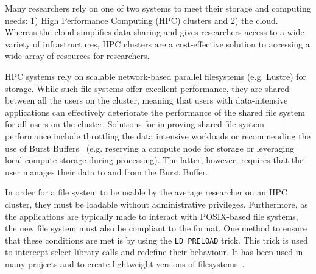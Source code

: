     
    
    
    Many researchers rely on one of two systems to meet their storage and
    computing needs: 1) High Performance Computing (HPC) clusters and 2) the
    cloud. Whereas the cloud simplifies data sharing and gives researchers
    access to a wide variety of infrastructures, HPC clusters are a
    cost-effective solution to accessing a wide array of resources for
    researchers. %
    
    HPC systems rely on scalable network-based parallel filesystems (e.g.
    Lustre) for storage. While such file systems offer excellent performance,
    they are shared between all the users on the cluster, meaning that users
    with data-intensive applications can effectively deteriorate the performance
    of the shared file system for all users on the cluster. Solutions for
    improving shared file system performance include throttling the data
    intensive workloads or recommending the use of Burst Buffers~\cite{bb} (e.g.
    reserving a compute node for storage or leveraging local compute storage
    during processing). The latter, however, requires that the user manages
    their data to and from the Burst Buffer.
    
    In order for a file system to be usable by the average researcher on an HPC
    cluster, they must be loadable without administrative privileges.
    Furthermore, as the applications are typically made to interact with
    POSIX-based file systems, the new file system must also be compliant to the
    format. One method to ensure that these conditions are met is by using the
    \texttt{LD\_PRELOAD} trick. This trick is used to intercept select library
    calls and redefine their behaviour. It has been used in many projects and to
    create lightweight versions of filesystems~\cite{xtreemfs}. 
    
